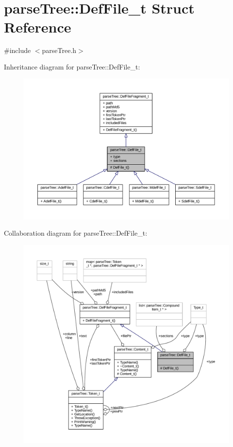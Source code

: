 \hypertarget{structparse_tree_1_1_def_file__t}{}\section{parse\+Tree\+:\+:Def\+File\+\_\+t Struct Reference}
\label{structparse_tree_1_1_def_file__t}


{\ttfamily \#include $<$parse\+Tree.\+h$>$}



Inheritance diagram for parse\+Tree\+:\+:Def\+File\+\_\+t\+:
\nopagebreak
\begin{figure}[H]
\begin{center}
\leavevmode
\includegraphics[width=350pt]{structparse_tree_1_1_def_file__t__inherit__graph}
\end{center}
\end{figure}


Collaboration diagram for parse\+Tree\+:\+:Def\+File\+\_\+t\+:
\nopagebreak
\begin{figure}[H]
\begin{center}
\leavevmode
\includegraphics[width=350pt]{structparse_tree_1_1_def_file__t__coll__graph}
\end{center}
\end{figure}
